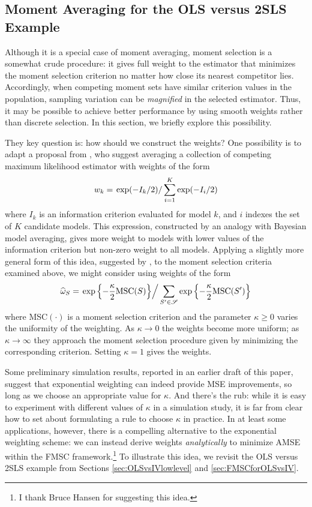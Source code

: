 \subsection{Moment Averaging for the OLS versus 2SLS Example}
\label{sec:momentavgexample}
Although it is a special case of moment averaging, moment selection is a somewhat crude procedure: it gives full weight to the estimator that minimizes the moment selection criterion no matter how close its nearest competitor lies. 
Accordingly, when competing moment sets have similar criterion values in the population, sampling variation can be \emph{magnified} in the selected estimator. 
Thus, it may be possible to achieve better performance by using smooth weights rather than discrete selection.
In this section, we briefly explore this possibility.

They key question is: how should we construct the weights?
One possibility is to adapt a proposal from \cite{Burnhametal}, who suggest averaging a collection of competing maximum likelihood estimator with weights of the form 
\[w_k =\left. \exp(-I_k/2)\right/\sum_{i=1}^K \exp(-I_i/2)\] 
where $I_k$ is an information criterion evaluated for model $k$, and $i$ indexes the set of $K$ candidate models. 
This expression, constructed by an analogy with Bayesian model averaging, gives more weight to models with lower values of the information criterion but non-zero weight to all models. 
Applying a slightly more general form of this idea, suggested by \cite{ClaeskensHjortbook}, to the moment selection criteria examined above, we might consider using weights of the form	
\[		\widehat{\omega}_S = \left.\exp\left\{-\frac{\kappa}{2} \mbox{MSC}(S)\right\}\right/\sum_{S' \in \mathscr{S}}\exp\left\{-\frac{\kappa}{2} \mbox{MSC}(S')\right\}\]
where MSC$(\cdot)$ is a moment selection criterion and the parameter $\kappa \geq 0$ varies the uniformity of the weighting. 
As $\kappa \rightarrow 0$ the weights become more uniform; as $\kappa \rightarrow \infty$ they approach the moment selection procedure given by minimizing the corresponding criterion. 
Setting $\kappa = 1$ gives the \cite{Burnhametal} weights.

Some preliminary simulation results, reported in an earlier draft of this paper, suggest that exponential weighting can indeed provide MSE improvements, so long as we choose an appropriate value for $\kappa$.
And there's the rub: while it is easy to experiment with different values of $\kappa$ in a simulation study, it is far from clear how to set about formulating a rule to choose $\kappa$ in practice. In at least some applications, however, there is a compelling alternative to the exponential weighting scheme: we can instead derive weights \emph{analytically} to minimize AMSE within the FMSC framework.\footnote{I thank Bruce Hansen for suggesting this idea.} 
To illustrate this idea, we revisit the OLS versus 2SLS example from Sections \ref{sec:OLSvsIVlowlevel} and \ref{sec:FMSCforOLSvsIV}. 


